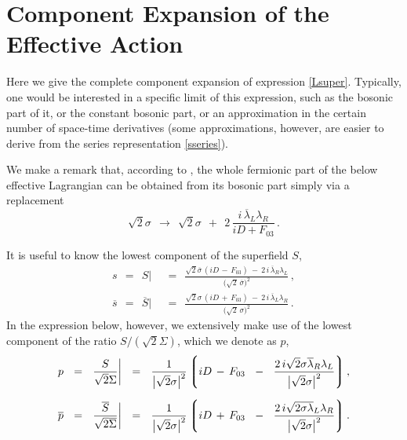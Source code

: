 \documentclass[epsfig,12pt]{article}
\def\beq{\begin{equation}}
\def\eeq{\end{equation}}
\newcommand{\ov}{\overline}
\newcommand{\lgr}{\left\lgroup}
\newcommand{\rgr}{\right\rgroup}
\begin{document}
\section{Component Expansion of the Effective Action}
\label{app:expansion}

	Here we give the complete component expansion of expression \eqref{Lsuper}. 
	Typically, one would be interested in a specific limit of this expression,
	such as the bosonic part of it, or the constant bosonic part, or 
	an approximation in the certain number of space-time derivatives
	(some approximations, however, are easier to derive from 
	the series representation \eqref{sseries}).

	We make a remark that, according to \cite{1p}, the whole fermionic part of
	the below effective Lagrangian can be obtained from its bosonic part simply
	via a replacement
\beq
	\sqrt{2}\sigma    ~~\longrightarrow~~    \sqrt{2}\sigma  ~~+~~  2\, \frac{i\,\ov\lambda{}_L\lambda_R}{iD + F_{03}}\,.
\eeq

	It is useful to know the lowest component of the superfield $ S $,
\begin{align*}
%
	s    ~~=~~
	S \Big| &    ~~=~~    \frac{ \sqrt{2}\ov\sigma\, ( iD \,-\, F_{03} ) ~-~ 2\,i\, \ov\lambda{}_R \lambda_L }
						{ \big( \sqrt{2}\, \ov\sigma \big)^2 }\,,
	\\[2mm]
%
	\ov s    ~~=~~
	\ov S \Big| &    ~~=~~    \frac{ \sqrt{2}\sigma\, ( iD \,+\, F_{03} ) ~-~ 2\,i\, \ov\lambda{}_L \lambda_R }
						{ \big( \sqrt{2}\, \sigma \big)^2 }\,.
\end{align*}
	In the expression below, however, we extensively make use of the lowest component of the ratio $ S / (\sqrt{2}\Sigma) $,
	which we denote as $ p $,
\begin{align*}
%
	p    ~~=~~
	\frac{S}{\sqrt{2}\Sigma} \bigg| &    ~~=~~
		\frac{1}{\big|\sqrt{2}\sigma\big|^2}
		\lgr
			iD \,-\, F_{03}
			~~-~~
			\frac{2\, i\sqrt{2}\sigma \ov\lambda{}_R\lambda_L}{\big|\sqrt{2}\sigma\big|^2}
		\rgr,
	\\[2mm]
%
	\ov p    ~~=~~
	\frac{\ov S}{\sqrt{2}\ov\Sigma} \bigg| &    ~~=~~
		\frac{1}{\big|\sqrt{2}\sigma\big|^2}
		\lgr
			iD \,+\, F_{03}
			~~-~~
			\frac{2\, i\sqrt{2}\ov{\sigma\lambda}{}_L\lambda_R}{\big|\sqrt{2}\sigma\big|^2}
		\rgr.
\end{align*}
\end{document}
